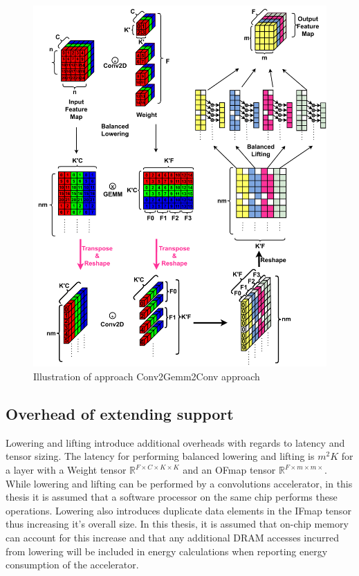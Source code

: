 \begin{figure}[]
    \centering
    \includegraphics[scale=0.5]{fig/ConvToGemmToConv.pdf}
    \caption{Illustration of approach Conv2Gemm2Conv approach}
    \label{fig:conv2gemm2conv}
\end{figure}

\subsection{Overhead of extending support}
\label{chap:conv_gemm_equiv:overhead}

Lowering and lifting introduce additional overheads with regards to latency and
tensor sizing. The latency for performing balanced lowering and lifting is
$m^{2}K$ for a layer with a Weight tensor $\mathbb{R}^{F\times C\times K\times
K}$ and an OFmap tensor $\mathbb{R}^{F\times m\times m\times}$. While lowering
and lifting can be performed by a convolutions accelerator, in this thesis it is
assumed that a software processor on the same chip performs these operations.
Lowering also introduces duplicate data elements in the IFmap tensor thus
increasing it's overall size. In this thesis, it is assumed that on-chip memory
can account for this increase and that any additional DRAM accesses incurred
from lowering will be included in energy calculations when reporting energy
consumption of the accelerator.

